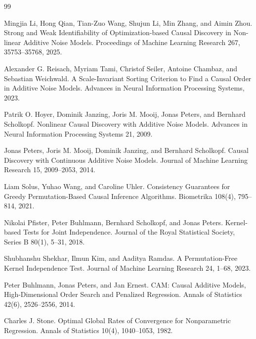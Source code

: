 \documentclass{article}
\begin{document}
\begin{thebibliography}{99}

   Mingjia Li, Hong Qian, Tian-Zuo Wang, Shujun Li, Min Zhang, and Aimin Zhou. Strong and Weak Identifiability of Optimization-based Causal Discovery in Non-linear Additive Noise Models. Proceedings of Machine Learning Research 267, 35753--35768, 2025.

   Alexander G. Reisach, Myriam Tami, Christof Seiler, Antoine Chambaz, and Sebastian Weichwald. A Scale-Invariant Sorting Criterion to Find a Causal Order in Additive Noise Models. Advances in Neural Information Processing Systems, 2023.

   Patrik O. Hoyer, Dominik Janzing, Joris M. Mooij, Jonas Peters, and Bernhard Scholkopf. Nonlinear Causal Discovery with Additive Noise Models. Advances in Neural Information Processing Systems 21, 2009.

   Jonas Peters, Joris M. Mooij, Dominik Janzing, and Bernhard Scholkopf. Causal Discovery with Continuous Additive Noise Models. Journal of Machine Learning Research 15, 2009--2053, 2014.

   Liam Solus, Yuhao Wang, and Caroline Uhler. Consistency Guarantees for Greedy Permutation-Based Causal Inference Algorithms. Biometrika 108(4), 795--814, 2021.

   Nikolai Pfister, Peter Buhlmann, Bernhard Scholkopf, and Jonas Peters. Kernel-based Tests for Joint Independence. Journal of the Royal Statistical Society, Series B 80(1), 5--31, 2018.

   Shubhanshu Shekhar, Ilmun Kim, and Aaditya Ramdas. A Permutation-Free Kernel Independence Test. Journal of Machine Learning Research 24, 1--68, 2023.

   Peter Buhlmann, Jonas Peters, and Jan Ernest. CAM: Causal Additive Models, High-Dimensional Order Search and Penalized Regression. Annals of Statistics 42(6), 2526--2556, 2014.

   Charles J. Stone. Optimal Global Rates of Convergence for Nonparametric Regression. Annals of Statistics 10(4), 1040--1053, 1982.

\end{thebibliography}
\end{document}
